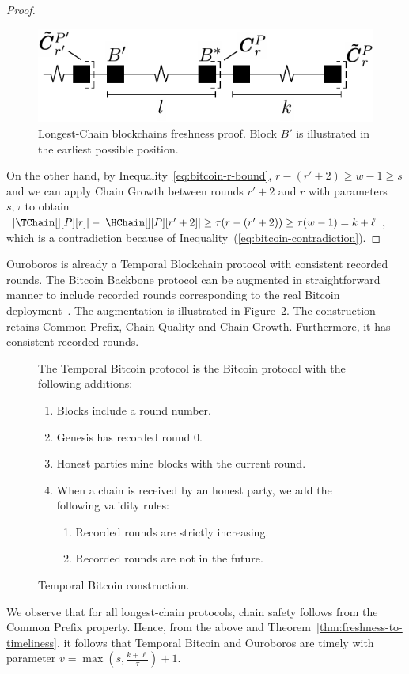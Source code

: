 \begin{proof}
  \begin{figure}
    \centering
    \includegraphics[width=0.5\columnwidth,keepaspectratio]{figures/longest-chain-proof.pdf}
    \caption{Longest-Chain blockchains freshness proof. Block $B'$ is illustrated in the
             earliest possible position.
    }
   \label{fig:longest-chain-freshness-proof}
  \end{figure}


  On the other hand, by Inequality~\ref{eq:bitcoin-r-bound}, $r - (r' + 2) \geq w - 1 \geq s$ and
  we can apply Chain Growth between rounds $r' + 2$ and $r$
  with parameters $s, \tau$ to obtain
  $|\TChain[][P][r]| - |\HChain[][P][r' + 2]| \geq \tau(r - (r' + 2)) \geq \tau (w - 1) =  k + \ell$,
  which is a contradiction because of Inequality~(\ref{eq:bitcoin-contradiction}).
  \Qed
\end{proof}

Ouroboros is already a Temporal Blockchain protocol with consistent recorded rounds.
The Bitcoin Backbone protocol can be augmented in
straightforward manner to include recorded rounds
corresponding to the real Bitcoin deployment~\cite{mastering-bitcoin}.
The augmentation is illustrated in Figure~\ref{fig.temporal-backbone}.
The construction retains Common Prefix, Chain Quality and Chain Growth.
Furthermore, it has consistent recorded rounds.

\begin{figure}
  The Temporal Bitcoin protocol is the Bitcoin protocol with
  the following additions:

  \begin{enumerate}
    \item Blocks include a round number.
    \item Genesis has recorded round $0$.
    \item Honest parties mine blocks with the current round.
    \item When a chain is received by an honest party, we add the following validity rules:
          \begin{enumerate}
            \item Recorded rounds are strictly increasing.
            \item Recorded rounds are not in the future.
          \end{enumerate}
  \end{enumerate}
  \caption{Temporal Bitcoin construction.}
  \label{fig.temporal-backbone}
\end{figure}

We observe that for all longest-chain protocols, chain safety follows from the
Common Prefix property. Hence, from the above and Theorem~\ref{thm:freshness-to-timeliness},
it follows that Temporal Bitcoin and
Ouroboros are timely with parameter $v = \max(s, \frac{k + \ell}{\tau}) + 1$.
